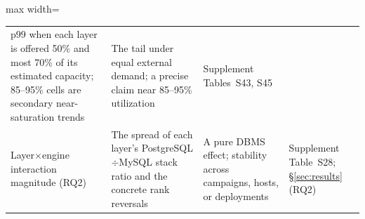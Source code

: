 \begin{table}[htbp]
\begin{adjustbox}{max width=\textwidth}
\begin{tabular}{@{}p{2.7cm} p{4.0cm} p{4.0cm} p{2.7cm}@{}}
    p99 when each layer is offered 50\% and most 70\% of its estimated capacity; 85--95\% cells are secondary near-saturation trends &
    The tail under equal external demand; a precise claim near 85--95\% utilization &
    Supplement Tables~S43, S45 \\
    \addlinespace
    Layer$\times$engine interaction magnitude (RQ2) &
    The spread of each layer's PostgreSQL$\div$MySQL stack ratio and the concrete rank reversals &
    A pure DBMS effect; stability across campaigns, hosts, or deployments &
    Supplement Table~S28; \S\ref{sec:results} (RQ2) \\
    \bottomrule
  \end{tabular}
  \end{adjustbox}
\end{table}
